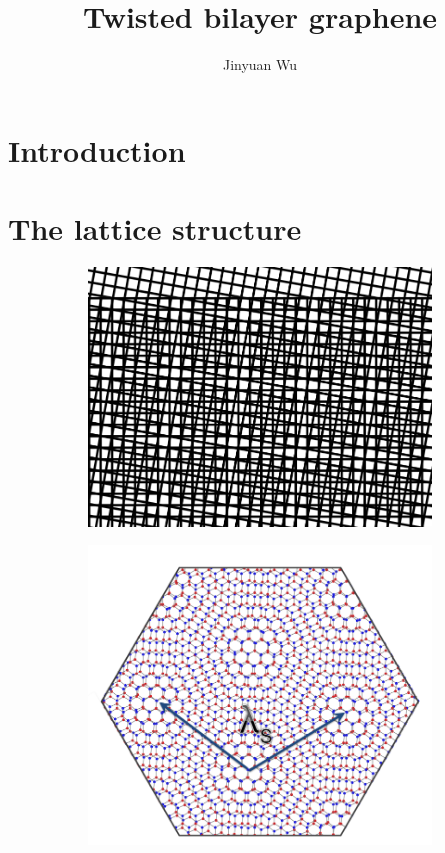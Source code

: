 \documentclass[hyperref, a4paper]{article}
\title{Twisted bilayer graphene}
\author{Jinyuan Wu}
\begin{document}
    
\maketitle

\section{Introduction}

\section{The lattice structure}

\begin{figure}
    \centering
    \begin{subfigure}{0.2\textwidth}
        \centering
        \includegraphics[width=\textwidth]{structure/moire-square.png}
        \subcaption{}
        \label{fig:square-moire}
    \end{subfigure}    
    \begin{subfigure}{0.3\textwidth}
        \centering
        \includegraphics[width=\textwidth]{structure/moire-graphene.PNG}

\end{subfigure}
\end{figure}
\end{document}
